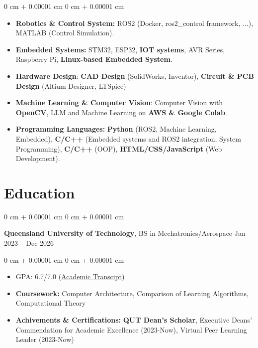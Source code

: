 \documentclass[10pt, letterpaper]{article}
\newenvironment{highlights}{
    \begin{itemize}[
        topsep=0.10 cm,
        parsep=0.10 cm,
        partopsep=0pt,
        itemsep=0pt,
        leftmargin=0 cm + 10pt
    ]
}{
    \end{itemize}
} %
\newenvironment{highlightsforbulletentries}{
    \begin{itemize}[
        topsep=0.10 cm,
        parsep=0.10 cm,
        partopsep=0pt,
        itemsep=0pt,
        leftmargin=10pt
    ]
}{
    \end{itemize}
} %
\newenvironment{onecolentry}{
    \begin{adjustwidth}{
        0 cm + 0.00001 cm
    }{
        0 cm + 0.00001 cm
    }
}{
    \end{adjustwidth}
} %
\newenvironment{twocolentry}[2][]{
    \onecolentry
    \def\secondColumn{#2}
    \setcolumnwidth{\fill, 4.5 cm}
    \begin{paracol}{2}
}{
    \switchcolumn \raggedleft \secondColumn
    \end{paracol}
    \endonecolentry
} %
\begin{document}
\begin{onecolentry}
      \begin{highlightsforbulletentries}

            \item \textbf{Robotics \& Control System:} ROS2 (Docker, ros2\_control framework, ...), MATLAB (Control Simulation).
            \item \textbf{Embedded Systems:} STM32, ESP32, \textbf{IOT systems}, AVR Series, Raspberry Pi, \textbf{Linux-based Embedded System}.
            \item \textbf{Hardware Design}: \textbf{CAD Design} (SolidWorks, Inventor), \textbf{Circuit \& PCB Design} (Altium Designer, LTSpice)
            \item \textbf{Machine Learning \& Computer Vision}: Computer Vision with \textbf{OpenCV},
            LLM and Machine Learning on \textbf{AWS \& Google Colab}.
            \item \textbf{Programming Languages:} \textbf{Python} (ROS2, Machine Learning, Embedded),
            \textbf{C/C++} (Embedded systems and ROS2 integration, System Programming), \textbf{C/C++} (OOP),
            \textbf{HTML/CSS/JavaScript} (Web Development).

      \end{highlightsforbulletentries}
\end{onecolentry}

\section{Education}

\begin{twocolentry}{
            Jan 2023 – Dec 2026
      }
      \textbf{Queensland University of Technology}, BS in Mechatronics/Aerospace\end{twocolentry}

\vspace{0.10 cm}
\begin{onecolentry}
      \begin{highlights}
            \item GPA: 6.7/7.0 (\href{https://example.com}{Academic Transcipt})
            \item \textbf{Coursework:} Computer Architecture, Comparison of Learning Algorithms, Computational Theory
            \item \textbf{Achivements \& Certifications:} \textbf{QUT Dean's Scholar},
            Executive Deans' Commendation for Academic Excellence (2023-Now),
            Virtual Peer Learning Leader (2023-Now)

      \end{highlights}
\end{onecolentry}
\end{document}
